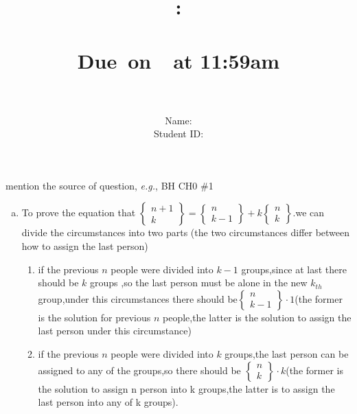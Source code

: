 \documentclass{article}
\title{
    \vspace{2in}
    \textmd{\textbf{\hmwkClass:\\  \hmwkTitle}}\\
    \normalsize\vspace{0.1in}\small{Due\ on\ \hmwkDueDate\ at 11:59am}\\
   \vspace{2in}\Huge{\hmwkClassID}\\   
   \vspace{2in}
}
\author{
	Name: \textbf{\hmwkAuthorName} \\
	Student ID: \hmwkAuthorID}
\date{}
\begin{document}
\maketitle
\pagebreak

\begin{homeworkProblem}{{\color{blue}mention the source of question}, \textit{e.g.}, BH CH0 \#1}

	\begin{enumerate}[(a)]
		
		
		
		\item To prove the equation that $\left\{\begin{array}{c}n+1 \\ k\end{array}\right\}=\left\{\begin{array}{c} n \\ k-1\end{array}\right\}+k\left\{\begin{array}{l} n \\ k\end{array}\right\}.$we can divide the circumstances into two parts (the two circumstances differ between how to assign the last person)\\
\begin{enumerate}[i]
\item if the previous $n$ people were divided into $k-1$ groups,since at last there should be $k$ groups ,so the last person must be alone in the new $k_{th}$ group,under this circumstances there should be$\left\{\begin{array}{c} n \\ k-1\end{array}\right\}\cdot 1$(the former is the solution for previous $n$ people,the latter is the solution to assign the last person under this circumstance) 
\item if the previous $n$ people were divided into $k$ groups,the last person can be assigned to any of the groups,so there should be $\left\{\begin{array}{c}n \\ k\end{array}\right\}\cdot k$(the former is the solution to assign n person into k groups,the latter is to assign the last person into any of k groups). 
\end{enumerate} 
	

\end{enumerate}
\end{homeworkProblem}
\end{document}
